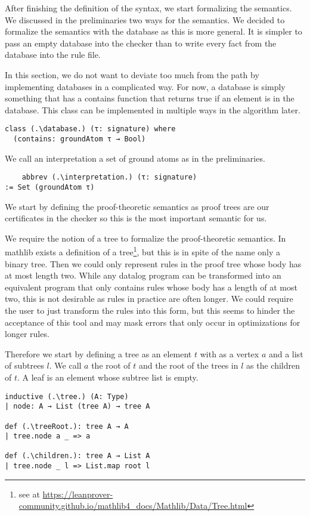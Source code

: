 After finishing the definition of the syntax, we start formalizing the semantics. We discussed in the preliminaries two ways for the semantics. We decided to formalize the semantics with the database as this is more general. It is simpler to pass an empty database into the checker than to write every fact from the database into the rule file.

In this section, we do not want to deviate too much from the path by implementing databases in a complicated way. For now, a database is simply something that has a contains function that returns true if an element is in the database. This class can be implemented in multiple ways in the algorithm later.

\begin{lstlisting}
class (.\database.) (τ: signature) where
  (contains: groundAtom τ → Bool)
\end{lstlisting}

We call an interpretation a set of ground atoms as in the preliminaries.
\begin{lstlisting}
    abbrev (.\interpretation.) (τ: signature)
:= Set (groundAtom τ)
\end{lstlisting}

We start by defining the proof-theoretic semantics as proof trees are our certificates in the checker so this is the most important semantic for us.

We require the notion of a tree to formalize the proof-theoretic semantics. In mathlib exists a definition of a tree\footnote{see at \protect\url{https://leanprover-community.github.io/mathlib4_docs/Mathlib/Data/Tree.html}}, but this is in spite of the name only a binary tree. Then we could only represent rules in the proof tree whose body has at most length two. While any datalog program can be transformed into an equivalent program that only contains rules whose body has a length of at most two, this is not desirable as rules in practice are often longer. We could require the user to just transform the rules into this form, but this seems to hinder the acceptance of this tool and may mask errors that only occur in optimizations for longer rules.

Therefore we start by defining a tree as an element $t$ with as a vertex $a$ and a list of subtrees $l$. We call $a$ the root of $t$ and the root of the trees in $l$ as the children of $t$. A leaf is an element whose subtree list is empty.

\begin{lstlisting}
inductive (.\tree.) (A: Type)
| node: A → List (tree A) → tree A

def (.\treeRoot.): tree A → A
| tree.node a _ => a

def (.\children.): tree A → List A
| tree.node _ l => List.map root l
\end{lstlisting}

